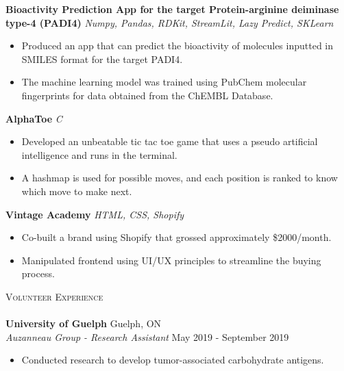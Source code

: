 \documentclass[a4paper]{article}
\newcommand{\lineunder} {
    \vspace*{-8pt} \\
    \hspace*{-18pt} \hrulefill \\
}
\newcommand{\header} [1] {
    {\hspace*{-18pt}\vspace*{6pt} \textsc{#1}}
    \vspace*{-6pt} \lineunder
}
\begin{document}
{\textbf{Bioactivity Prediction App for the target Protein-arginine deiminase type-4 (PADI4)}} {\sl Numpy, Pandas, RDKit, StreamLit, Lazy Predict, SKLearn} \\
\vspace{-1mm}
\begin{itemize} \itemsep 1pt
	\item Produced an app that can predict the bioactivity of molecules inputted in SMILES format for the target PADI4.
	\item The machine learning model was trained using PubChem molecular fingerprints for data obtained from the ChEMBL Database.
\end{itemize}
\vspace*{1mm}

{\textbf{AlphaToe}} {\sl C}\\
\vspace{-1mm}
\begin{itemize} \itemsep 1pt
	\item Developed an unbeatable tic tac toe game that uses a pseudo artificial intelligence and runs in the terminal.
	\item A hashmap is used for possible moves, and each position is ranked to know which move to make next.\\
\end{itemize}
\vspace*{1mm}

{\textbf{Vintage Academy}} {\sl HTML, CSS, Shopify} \\
\vspace{-1mm}
\begin{itemize} \itemsep 1pt
	\item Co-built a brand using Shopify that grossed approximately      \$2000/month.
	\item Manipulated frontend using UI/UX principles to streamline the buying process.\\
\end{itemize}

\header{Volunteer Experience}

\textbf{University of Guelph} \hfill Guelph, ON\\
\textit{Auzanneau Group - Research Assistant} \hfill May 2019 - September 2019\\
\vspace{-1mm}
\begin{itemize} \itemsep 1pt
	\item Conducted research to develop tumor-associated carbohydrate antigens.
\end{itemize}
\end{document}
